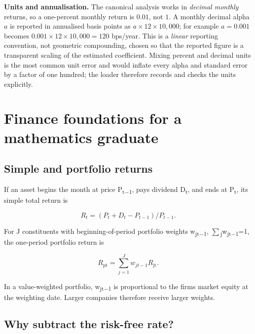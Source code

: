 \textbf{Units and annualisation.} The canonical analysis works in
\emph{decimal monthly} returns, so a one-percent monthly return is
$0.01$, not $1$. A monthly decimal alpha $a$ is reported in annualised
basis points as $a\times 12\times 10{,}000$; for example $a=0.001$ becomes
$0.001\times 12\times 10{,}000 = 120$ bps/year. This is a \emph{linear}
reporting convention, not geometric compounding, chosen so that the
reported figure is a transparent scaling of the estimated coefficient.
Mixing percent and decimal units is the most common unit error and would
inflate every alpha and standard error by a factor of one hundred; the
loader therefore records and checks the units explicitly.

\hypertarget{finance-foundations-for-a-mathematics-graduate}{%
\section{Finance foundations for a mathematics
graduate}\label{finance-foundations-for-a-mathematics-graduate}}

\hypertarget{simple-and-portfolio-returns}{%
\subsection{Simple and portfolio
returns}\label{simple-and-portfolio-returns}}

If an asset begins the month at price P\textsubscript{t\ensuremath{-}1}, pays
dividend D\textsubscript{t}, and ends at P\textsubscript{t}, its simple
total return is

\begin{equation}
R_{t} = (P_{t} + D_{t} - P_{t-1}) / P_{t-1}.
\end{equation}

For J constituents with beginning-of-period portfolio weights
w\textsubscript{jt\ensuremath{-}1}, \ensuremath{\sum }\textsubscript{j}w\textsubscript{jt\ensuremath{-}1}=1, the
one-period portfolio return is

\begin{equation}
R_{\mathrm{pt}} = \sum _{j=1}^{J} w_{jt-1}R_{\mathrm{jt}}.
\end{equation}

In a value-weighted portfolio, w\textsubscript{jt\ensuremath{-}1} is proportional to
the firm\textquotesingle s market equity at the weighting date. Larger
companies therefore receive larger weights.

\hypertarget{why-subtract-the-risk-free-rate}{%
\subsection{Why subtract the risk-free
rate?}\label{why-subtract-the-risk-free-rate}}

